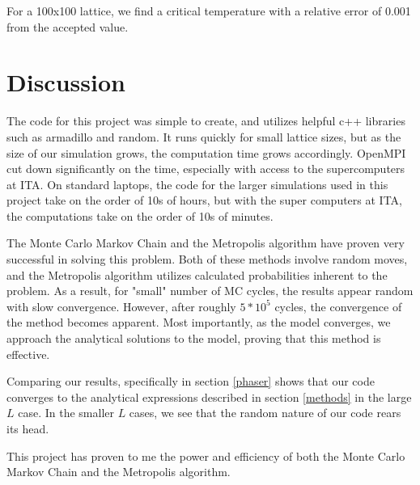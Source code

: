 \documentclass[a4paper]{article}
\begin{document}
For a 100x100 lattice, we find a critical temperature with a relative error of 0.001 from the accepted value. 

\clearpage

\section{Discussion}\label{discussion}

The code for this project was simple to create, and utilizes helpful c++ libraries such as armadillo and random. It runs quickly for small lattice sizes, but as the size of our simulation grows, the computation time grows accordingly. OpenMPI cut down significantly on the time, especially with access to the supercomputers at ITA. On standard laptops, the code for the larger simulations used in this project take on the order of 10s of hours, but with the super computers at ITA, the computations take on the order of 10s of minutes.

The Monte Carlo Markov Chain and the Metropolis algorithm have proven very successful in solving this problem. Both of these methods involve random moves, and the Metropolis algorithm utilizes calculated probabilities inherent to the problem. As a result, for "small" number of MC cycles, the results appear random with slow convergence. However, after roughly $5*10^5$ cycles, the convergence of the method becomes apparent. Most importantly, as the model converges, we approach the analytical solutions to the model, proving that this method is effective.

Comparing our results, specifically in section \ref{phaser} shows that our code converges to the analytical expressions described in section \ref{methods} in the large $L$ case. In the smaller $L$ cases, we see that the random nature of our code rears its head. 

This project has proven to me the power and efficiency of both the Monte Carlo Markov Chain and the Metropolis algorithm.



\end{document}
